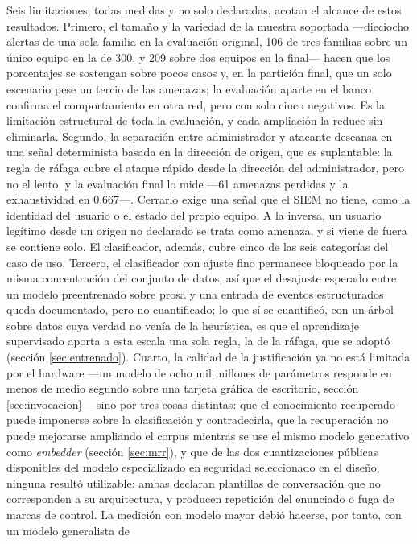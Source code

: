 Seis limitaciones, todas medidas y no solo declaradas, acotan el alcance de estos resultados.
Primero, el tamaño y la variedad de la muestra soportada ---dieciocho alertas de una sola familia
en la evaluación original, 106 de tres familias sobre un único equipo en la de 300, y 209 sobre dos
equipos en la final--- hacen que los porcentajes se sostengan sobre pocos casos y, en la partición
final, que un solo escenario pese un tercio de las amenazas; la evaluación aparte en el banco
confirma el comportamiento en otra red, pero con solo cinco negativos. Es la limitación estructural
de toda la evaluación, y cada ampliación la reduce sin eliminarla. Segundo, la separación entre
administrador y atacante descansa en una señal determinista basada en la dirección de origen, que
es suplantable: la regla de ráfaga cubre el ataque rápido desde la dirección del administrador,
pero no el lento, y la evaluación final lo mide ---61 amenazas perdidas y la exhaustividad en
0,667---. Cerrarlo exige una señal que el SIEM no tiene, como la identidad del usuario o el estado
del propio equipo. A la inversa, un usuario legítimo desde un origen no declarado se trata como
amenaza, y si viene de fuera se contiene solo. El clasificador, además, cubre cinco de las seis
categorías del caso de uso. Tercero, el clasificador con ajuste fino permanece
bloqueado por la misma concentración del conjunto de datos, así que el desajuste esperado entre un
modelo preentrenado sobre prosa y una entrada de eventos estructurados queda documentado, pero no
cuantificado; lo que sí se cuantificó, con un árbol sobre datos cuya verdad no venía de la
heurística, es que el aprendizaje supervisado aporta a esta escala una sola regla, la de la
ráfaga, que se adoptó (sección \ref{sec:entrenado}). Cuarto, la calidad de la justificación ya no está limitada por el hardware ---un modelo de ocho mil
millones de parámetros responde en menos de medio segundo sobre una tarjeta gráfica de escritorio,
sección \ref{sec:invocacion}--- sino por tres cosas distintas: que el conocimiento recuperado puede
imponerse sobre la clasificación y contradecirla, que la recuperación no puede mejorarse ampliando
el corpus mientras se use el mismo modelo generativo como \emph{embedder} (sección \ref{sec:mrr}),
y que de las dos cuantizaciones públicas disponibles del modelo especializado en seguridad
seleccionado en el diseño, ninguna resultó utilizable: ambas declaran plantillas de conversación
que no corresponden a su arquitectura, y producen repetición del enunciado o fuga de marcas de
control. La medición con modelo mayor debió hacerse, por tanto, con un modelo generalista de
